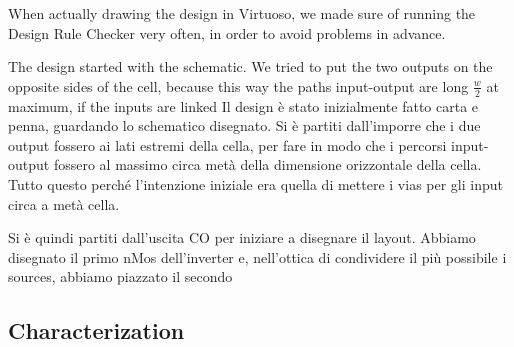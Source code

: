 \documentclass[a4paper]{article}
\begin{document}
When actually drawing the design in Virtuoso, we made sure of running the Design Rule Checker very often, in order to avoid problems in advance. 

The design started with the schematic. We tried to put the two outputs on the opposite sides of the cell, because this way the paths input-output are long $\frac{w}{2}$ at maximum, if the inputs are linked
Il design è stato inizialmente fatto carta e penna, guardando lo schematico disegnato. Si è partiti dall'imporre che i due output fossero ai lati estremi della cella, per fare in modo che i percorsi input-output fossero al massimo circa metà della dimensione orizzontale della cella. Tutto questo perché l'intenzione iniziale era quella di mettere i vias per gli input circa a metà cella. 

Si è quindi partiti dall'uscita CO per iniziare a disegnare il layout. Abbiamo disegnato il primo nMos dell'inverter e, nell'ottica di condividere il più possibile i sources, abbiamo piazzato il secondo


\subsection{Characterization}
\end{document}
